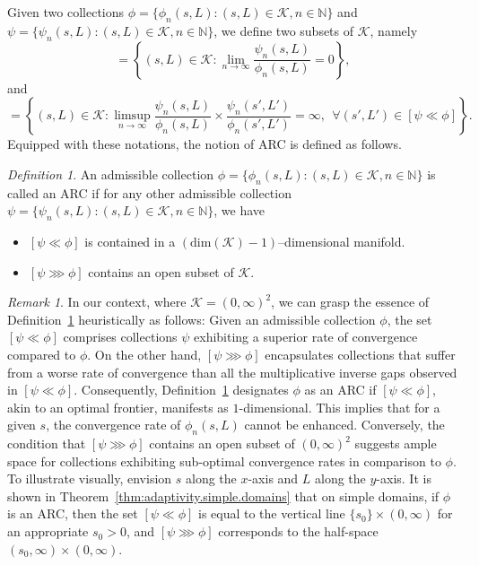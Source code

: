 \documentclass[bj,authoryear]{imsart}
\numberwithin{equation}{section}
\theoremstyle{plain}
\theoremstyle{remark}
\newtheorem{definition}{Definition}
\newtheorem{remark}{Remark}
\newcommand{\N}{\mathbb{N}}
\newcommand{\1}{\mathds{1}}
\begin{document}
    Given two collections $\phi = \{\phi_n(s,L) : (s,L)\in \mathcal{K}, n\in \N\}$ and  $\psi = \{\psi_n(s,L) : (s,L)\in \mathcal{K}, n\in \N\}$, we define two subsets of $\mathcal{K}$, namely
    \begin{equation*}
        [\psi \ll \phi] = \left\{(s,L)\in \mathcal{K} : \lim_{n\to\infty} \frac{\psi_n(s,L)}{\phi_n(s,L)} = 0\right\},
    \end{equation*}
    and
    \begin{equation*}
        [\psi \ggg \phi] = \left\{(s,L)\in \mathcal{K} : \limsup_{n\to\infty} \frac{\psi_n(s,L)}{\phi_n(s,L)}\times\frac{\psi_n(s',L')}{\phi_n(s',L')} =\infty, ~~ \forall (s',L')\in[\psi \ll \phi]\right\}.
    \end{equation*}
    Equipped with these notations, the notion of ARC is defined as follows.

    \begin{definition}\label{def:ARC}
        An admissible collection $\phi = \{\phi_n(s,L) : (s,L)\in \mathcal{K}, n\in \N\}$ is called an ARC if for any other admissible collection $\psi = \{\psi_n(s,L) : (s,L)\in \mathcal{K}, n\in \N\}$, we have
        \begin{itemize}
            \item $[\psi\ll\phi]$ is contained in a $(\mathrm{dim}(\mathcal{K})-1)$--dimensional  manifold.
            \item $[\psi\ggg\phi]$ contains an open subset of $\mathcal{K}$.
        \end{itemize}
    \end{definition}

    \begin{remark}\upshape
        In our context, where $\mathcal{K} = (0,\infty)^2$, we can grasp the essence of Definition~\ref{def:ARC} heuristically as follows: Given an admissible collection $\phi$, the set $[\psi\ll\phi]$ comprises collections $\psi$ exhibiting a superior rate of convergence compared to $\phi$. On the other hand, $[\psi\ggg\phi]$ encapsulates collections that suffer from a worse rate of convergence than all the multiplicative inverse gaps observed in $[\psi\ll\phi]$. Consequently, Definition~\ref{def:ARC} designates $\phi$ as an ARC if $[\psi\ll\phi]$, akin to an optimal frontier, manifests as $1$-dimensional. This implies that for a given $s$, the convergence rate of $\phi_n(s,L)$ cannot be enhanced. Conversely, the condition that $[\psi\ggg\phi]$ contains an open subset of $(0,\infty)^2$ suggests ample space for collections exhibiting sub-optimal convergence rates in comparison to $\phi$. To illustrate visually, envision $s$ along the $x$-axis and $L$ along the $y$-axis. It is shown in Theorem~\ref{thm:adaptivity.simple.domains} that on simple domains, if $\phi$ is an ARC, then the set $[\psi\ll\phi]$ is equal to the vertical line $\{s_0\} \times (0,\infty)$ for an appropriate $s_0 > 0$, and $[\psi\ggg\phi]$ corresponds to the half-space $(s_0,\infty) \times (0,\infty)$.
    \end{remark}
\end{document}

